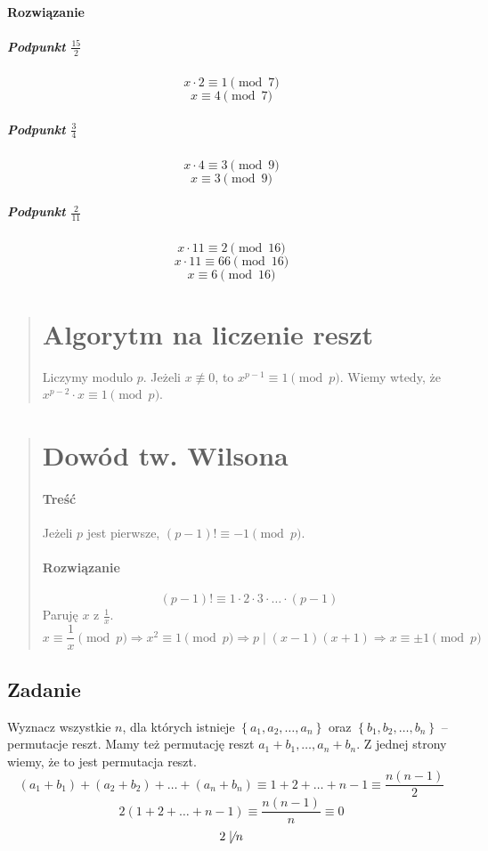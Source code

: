 \documentclass [a4paper, 10pt]{article}
\begin{document}
        \paragraph{Rozwiązanie}
        \subparagraph{Podpunkt $\frac{15}2$}
            \[
                x\cdot 2 \equiv 1\pmod 7
            \]
            \[
                x \equiv 4\pmod 7
            \]
        \subparagraph{Podpunkt $\frac34$}
            \[
                x\cdot 4 \equiv 3 \pmod 9
            \]
            \[
                x\equiv 3 \pmod 9
            \]
        \subparagraph{Podpunkt $\frac2{11}$}
            \[
                x\cdot 11 \equiv 2 \pmod {16}
            \]
            \[
                x\cdot 11\equiv 66\pmod {16}
            \]
            \[
                x\equiv 6\pmod {16}
            \]
    \begin{quote}
        \color{Sepia}
        \section*{Algorytm na liczenie reszt}
            Liczymy modulo $p$.
            Jeżeli $x\not\equiv 0$, to $x^{p-1} \equiv 1\pmod p$.
            Wiemy wtedy, że $x^{p-2}\cdot x \equiv 1\pmod p$.
    \end{quote}
    \begin{quote}
    \color{Sepia}
        \section*{Dowód tw. Wilsona}
            \paragraph{Treść} Jeżeli $p$ jest pierwsze, $(p-1)! \equiv -1 \pmod p$.
            \paragraph{Rozwiązanie}
            \[
                (p-1)! \equiv 1\cdot 2\cdot 3\cdot \dots\cdot (p-1)
            \]
            Paruję $x$ z $\frac1x$.
            \[
                x\equiv \frac1x \pmod p \Rightarrow x^2 \equiv 1\pmod p \Rightarrow p\mid(x-1)(x+1) \Rightarrow x\equiv \pm1 \pmod p
            \]
    \end{quote}
    \subsection{Zadanie} %
    \label{sub:zadanie}
        Wyznacz wszystkie $n$, dla których istnieje $\left\{a_1,a_2,\dots,a_n\right\}$ oraz $\left\{b_1,b_2,\dots,b_n\right\}$ -- permutacje reszt. Mamy też permutację reszt $a_1+b_1, \dots, a_n+b_n$. Z jednej strony wiemy, że to jest permutacja reszt.
        \[
            (a_1+b_1)+(a_2+b_2)+\dots+(a_n+b_n) \equiv 1+2+\dots+n-1 \equiv \frac{n(n-1)}2
        \]
        \[
            2(1+2+\dots+n-1)\equiv\frac{n(n-1)}n \equiv 0
        \]
        \[
            2\not\mid n
        \]
\end{document}
